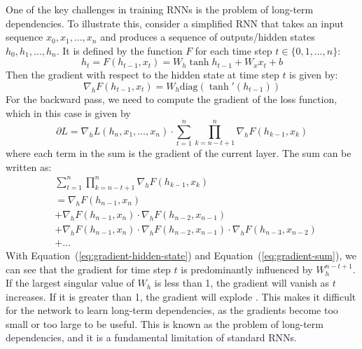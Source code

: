 \documentclass{article}
\newcommand{\refeqn}[1]{Equation~(\ref{#1})}
\begin{document}
One of the key challenges in training RNNs is the problem of long-term dependencies. To
illustrate this, consider a simplified RNN \cite{pascanuDifficultyTrainingRecurrent2013}
that takes an input sequence $x_0, x_1, \ldots, x_n$ and produces a sequence of
outputs/hidden states $h_0, h_1, \ldots, h_n$. It is defined by the function $F$ for each
time step $t \in \{0, 1, \ldots, n\}$:
\begin{equation}
  h_t = F(h_{t-1}, x_t) = W_h \tanh{h_{t-1}} + W_x x_t + b
\end{equation}
Then the gradient with respect to the hidden state at time step $t$ is given by:
\begin{equation}
  \label{eq:gradient-hidden-state}
  \nabla_h F(h_{t-1}, x_t) = W_h \text{diag}(\tanh'(h_{t-1}))
\end{equation}
For the backward pass, we need to compute the gradient of the loss function, which in
this case is given by
\begin{equation}
  \partial L = \nabla_h L(h_n, x_1, \ldots, x_n) \cdot \sum_{t=1}^{n} \prod_{k=n-t+1}^{n} \nabla_h F(h_{k-1}, x_k)
\end{equation}
where each term in the sum is the gradient of the current layer. The sum can be written
as:
\begin{align}
   & \sum_{t=1}^{n} \prod_{k=n-t+1}^{n} \nabla_h F(h_{k-1}, x_k)                                      \label{eq:gradient-sum} \\
   & = \nabla_h F(h_{n-1}, x_n)                                                                       \nonumber               \\
   & + \nabla_h F(h_{n-1}, x_n) \cdot \nabla_h F(h_{n-2}, x_{n-1})                                    \nonumber               \\
   & + \nabla_h F(h_{n-1}, x_n) \cdot \nabla_h F(h_{n-2}, x_{n-1}) \cdot \nabla_h F(h_{n-3}, x_{n-2}) \nonumber               \\
   & + \ldots \nonumber
\end{align}
With \refeqn{eq:gradient-hidden-state} and \refeqn{eq:gradient-sum}, we can see that the
gradient for time step $t$ is predominantly influenced by $W_h^{n-t+1}$. If the largest
singular value of $W_h$ is less than 1, the gradient will vanish as $t$ increases. If it
is greater than 1, the gradient will explode
\cite{pascanuDifficultyTrainingRecurrent2013}. This makes it difficult for the network to
learn long-term dependencies, as the gradients become too small or too large to be useful.
This is known as the problem of long-term dependencies, and it is a fundamental limitation
of standard RNNs.
\end{document}
